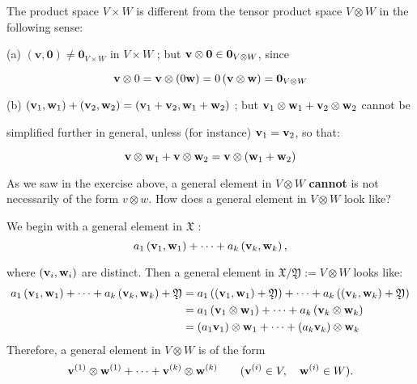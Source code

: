 \begin{remark}
The product space \(V \times  W\) is different from the tensor product space \(V \otimes  W\) in the following sense:

(a) \(\left( {\mathbf{v},\mathbf{0}}\right)  \neq  {\mathbf{0}}_{V \times  W}\) in \(V \times  W\) ; but \(\mathbf{v} \otimes  {\bf 0} \in  {\bf 0}_{V \otimes  W}\), since

\[
{\bf v} \otimes  0 = {\bf v} \otimes  \left( {0\mathbf{w}}\right)
= 0\left( {\bf v} \otimes  {\bf w}\right) = {\bf 0}_{V \otimes  W}
\]


(b) \(\left( {{\bf v}_1,{\bf w}_1}\right)  + \left( {{\bf v}_2,{\bf w}_2}\right)  = \left( {{\bf v}_1 + {\bf v}_2,{\bf w}_1 + {\bf w}_2}\right)\) ; but \({\bf v}_1 \otimes  {\bf w}_1 + {\bf v}_2 \otimes  {\bf w}_2\) cannot be

simplified further in general, unless (for instance) \({\bf v}_1 = {\bf v}_2\), so that:

\[
\mathbf{v} \otimes  {\bf w}_1 + \mathbf{v} \otimes  {\bf w}_2 = \mathbf{v} \otimes  \left( {{\bf w}_1 + {\bf w}_2}\right)
\]

As we saw in the exercise above, a general element in $V \otimes W$ {\bf cannot} is not necessarily of the form $v \otimes w$.
How does a general element in $V \otimes W$ look like?

We begin with a general element in \(\mathfrak{X}\) :
\[
{a}_1\left( {{\bf v}_1,{\bf w}_1}\right)  + \cdots  + {a}_k\left( {{\bf v}_k,{\bf w}_k}\right) ,
\]

where \(\left( {{\bf v}_{i},{\bf w}_{i}}\right)\) are distinct. Then a general element in \(\mathfrak{X}/\mathfrak{Y} \mathrel{\text{ := }} V \otimes  W\) looks like:
\begin{align*}
{a}_1\left( {{\bf v}_1,{\bf w}_1}\right)  + \cdots  + {a}_k\left( {{\bf v}_k,{\bf w}_k}\right)  + \mathfrak{Y} &= {a}_1\left( {\left( {{\bf v}_1,{\bf w}_1}\right)  + \mathfrak{Y}}\right)  + \cdots  + {a}_k\left( {\left( {{\bf v}_k,{\bf w}_k}\right)  + \mathfrak{Y}}\right)
\\
&= {a}_1\left( {{\bf v}_1 \otimes  {\bf w}_1}\right)  + \cdots  + {a}_k\left( {{\bf v}_k \otimes  {\bf w}_k}\right)
\\
&= \left( {{a}_1{\bf v}_1}\right)  \otimes  {\bf w}_1 + \cdots  + \left( {{a}_k{\bf v}_k}\right)  \otimes  {\bf w}_k
\end{align*}
Therefore, a general element in \(V \otimes  W\) is of the form
\begin{equation} \label{eq:generaltensor}
{\bf v}^{(1)} \otimes  {\bf w}^{(1)} + \cdots  + {\bf v}^{(k)} \otimes  {\bf w}^{(k)} \quad \quad ({\bf v}^{(i)} \in  V, \quad {\bf w}^{(i)} \in  W).
\end{equation}
\end{remark}

